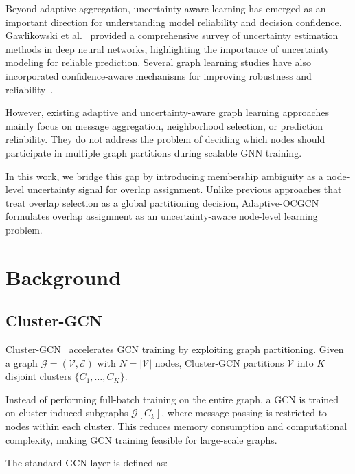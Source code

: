 \documentclass[a4paper,11pt,oneside,onecolumn,preprint]{elsarticle}
\numberwithin{equation}{section}
\begin{document}
Beyond adaptive aggregation, uncertainty-aware learning has emerged as an important direction for understanding model reliability and decision confidence.
Gawlikowski et al.~\cite{Gawlikowski2023} provided a comprehensive survey of uncertainty estimation methods in deep neural networks, highlighting the importance of uncertainty modeling for reliable prediction.
Several graph learning studies have also incorporated confidence-aware mechanisms for improving robustness and reliability~\cite{Kwon2022, Park2023}.

However, existing adaptive and uncertainty-aware graph learning approaches mainly focus on message aggregation, neighborhood selection, or prediction reliability.
They do not address the problem of deciding which nodes should participate in multiple graph partitions during scalable GNN training.

In this work, we bridge this gap by introducing membership ambiguity as a node-level uncertainty signal for overlap assignment.
Unlike previous approaches that treat overlap selection as a global partitioning decision, Adaptive-OCGCN formulates overlap assignment as an uncertainty-aware node-level learning problem.


\section{Background}
\label{sec:background}

\subsection{Cluster-GCN}
\label{subsec:clustergcn}

Cluster-GCN~\cite{Cluster-GCN} accelerates GCN training by exploiting graph partitioning.
Given a graph $\mathcal{G}=(\mathcal{V},\mathcal{E})$ with $N=|\mathcal{V}|$ nodes, Cluster-GCN partitions $\mathcal{V}$ into $K$ disjoint clusters $\{C_1,\ldots,C_K\}$.

Instead of performing full-batch training on the entire graph, a GCN is trained on cluster-induced subgraphs $\mathcal{G}[C_k]$, where message passing is restricted to nodes within each cluster.
This reduces memory consumption and computational complexity, making GCN training feasible for large-scale graphs.

The standard GCN layer is defined as:
\end{document}
